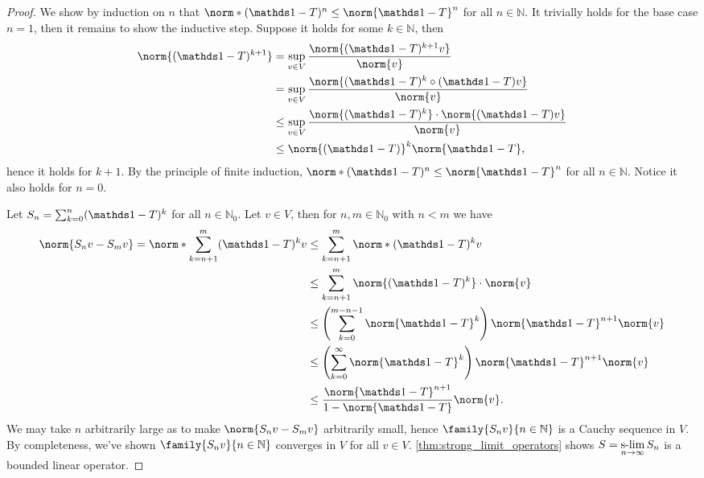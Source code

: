 \begin{proof}
    We show by induction on \(n\) that \(\norm*{(\unity - T)^n} \leq \norm{\unity - T}^n\) for all \(n \in \mathbb{N}\). It trivially holds for the base case \(n = 1\), then it remains to show the inductive step. Suppose it holds for some \(k \in \mathbb{N}\), then
    \begin{align*}
        \norm{(\unity - T)^{k+1}} &= \sup_{v \in V}\frac{\norm{(\unity - T)^{k+1}v}}{\norm{v}}\\
                                  &= \sup_{v \in V} \frac{\norm{(\unity - T)^k \circ (\unity - T)v}}{\norm{v}}\\
                                  &\leq \sup_{v \in V} \frac{\norm{(\unity - T)^k}\cdot \norm{(\unity - T)v}}{\norm{v}}\\
                                  &\leq \norm{(\unity - T)}^k \norm{\unity - T},
    \end{align*}
    hence it holds for \(k + 1\). By the principle of finite induction, \(\norm*{(\unity - T)^n} \leq \norm{\unity - T}^n\) for all \(n \in \mathbb{N}\). Notice it also holds for \(n = 0\).

    Let \(S_n = \sum_{k=0}^n (\unity - T)^k\) for all \(n \in \mathbb{N}_0\). Let \(v \in V\), then for \(n, m \in \mathbb{N}_0\) with \(n < m\) we have
    \begin{align*}
        \norm{S_nv - S_mv} = \norm*{\sum_{k=n+1}^m (\unity - T)^kv} &\leq \sum_{k=n+1}^m \norm*{(\unity - T)^kv}\\
        &\leq \sum_{k = n+1}^m \norm{(\unity - T)^k}\cdot\norm{v}                        \\
        &\leq \left(\sum_{k=0}^{m-n-1} \norm{\unity - T}^k\right) \norm{\unity - T}^{n+1}\norm{v}                   \\
        &\leq \left(\sum_{k=0}^\infty \norm{\unity - T}^k\right) \norm{\unity - T}^{n+1} \norm{v}\\
        &\leq \frac{\norm{\unity - T}^{n+1}}{1 - \norm{\unity - T}} \norm{v}.
    \end{align*}
    We may take \(n\) arbitrarily large as to make \(\norm{S_nv - S_mv}\) arbitrarily small, hence \(\family{S_nv}{n\in \mathbb{N}}\) is a Cauchy sequence in \(V\). By completeness, we've shown \(\family{S_nv}{n\in \mathbb{N}}\) converges in \(V\) for all \(v \in V\). \cref{thm:strong_limit_operators} shows \(S = \displaystyle{\operatorname*{s-lim}_{n\to\infty}S_n}\) is a bounded linear operator.


\end{proof}
